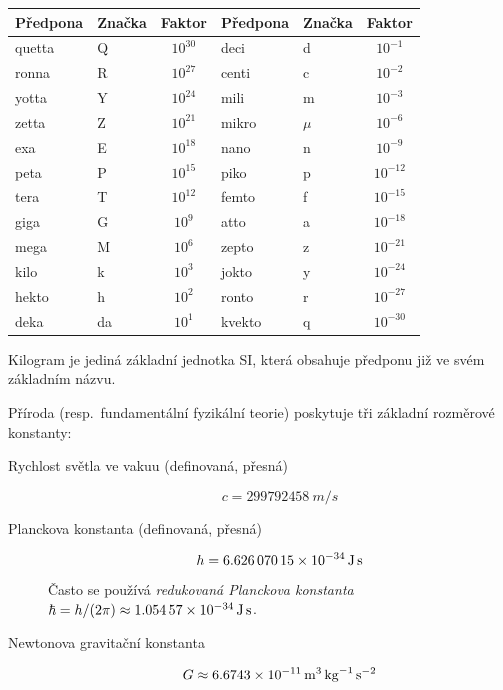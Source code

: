 \begin{center}
    \begin{tabular}{llc|llc}
        \toprule
        Předpona & Značka & Faktor & Předpona & Značka & Faktor \\ \midrule
        quetta & Q  & $10^{30}$ & deci   & d     & $10^{-1}$ \\
        ronna  & R  & $10^{27}$ & centi  & c     & $10^{-2}$ \\
        yotta  & Y  & $10^{24}$ & mili   & m     & $10^{-3}$ \\
        zetta  & Z  & $10^{21}$ & mikro  & $\mu$ & $10^{-6}$ \\
        exa    & E  & $10^{18}$ & nano   & n     & $10^{-9}$ \\
        peta   & P  & $10^{15}$ & piko   & p     & $10^{-12}$ \\
        tera   & T  & $10^{12}$ & femto  & f     & $10^{-15}$ \\
        giga   & G  & $10^{9}$  & atto   & a     & $10^{-18}$ \\
        mega   & M  & $10^{6}$  & zepto  & z     & $10^{-21}$ \\
        kilo   & k  & $10^{3}$  & jokto  & y     & $10^{-24}$ \\
        hekto  & h  & $10^{2}$  & ronto  & r     & $10^{-27}$ \\
        deka   & da & $10^{1}$  & kvekto & q     & $10^{-30}$ \\
        \bottomrule
    \end{tabular}
\end{center}
\begin{poznamka}
    Kilogram je jediná základní jednotka SI, která obsahuje předponu již ve svém základním názvu.
\end{poznamka}

Příroda (resp.~fundamentální fyzikální teorie) poskytuje tři základní rozměrové konstanty:
\begin{description}
    \item[Rychlost světla ve vakuu (definovaná, přesná)] $$c = \qty{299 792 458}{m/s}$$
    \item[Planckova konstanta (definovaná, přesná)] $$ h = \qty{6.62607015d-34}{J.s} $$ Často se používá \emph{redukovaná Planckova konstanta} $\hbar = h / (2\pi) \approx \qty{1.05457d-34}{J.s}$.
    \item[Newtonova gravitační konstanta] $$ G \approx \qty{6.6743d-11}{m^3.kg^{-1}.s^{-2}} $$
\end{description}

